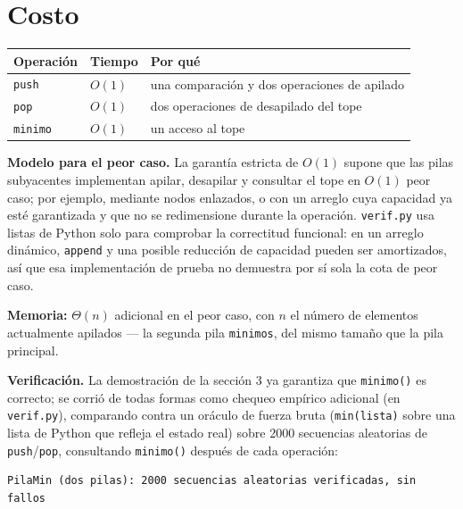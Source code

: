\documentclass[11pt]{article}
\begin{document}
\section{Costo}

\begin{center}
\begin{tabular}{@{}lll@{}}
\toprule
\textbf{Operación} & \textbf{Tiempo} & \textbf{Por qué} \\
\midrule
\texttt{push} & $O(1)$ & una comparación y dos operaciones de apilado \\
\texttt{pop} & $O(1)$ & dos operaciones de desapilado del tope \\
\texttt{minimo} & $O(1)$ & un acceso al tope \\
\bottomrule
\end{tabular}
\end{center}

\textbf{Modelo para el peor caso.} La garantía estricta de $O(1)$ supone que las pilas subyacentes implementan
apilar, desapilar y consultar el tope en $O(1)$ peor caso; por ejemplo, mediante nodos enlazados, o con un
arreglo cuya capacidad ya esté garantizada y que no se redimensione durante la operación. \texttt{verif.py}
usa listas de Python solo para comprobar la correctitud funcional: en un arreglo dinámico, \texttt{append} y una
posible reducción de capacidad pueden ser amortizados, así que esa implementación de prueba no demuestra por sí
sola la cota de peor caso.

\textbf{Memoria:} $\Theta(n)$ adicional en el peor caso, con $n$ el número de elementos actualmente
apilados --- la segunda pila \texttt{minimos}, del mismo tamaño que la pila principal.

\textbf{Verificación.} La demostración de la sección 3 ya garantiza que \texttt{minimo()} es correcto; se
corrió de todas formas como chequeo empírico adicional (en \texttt{verif.py}), comparando contra un oráculo
de fuerza bruta (\texttt{min(lista)} sobre una lista de Python que refleja el estado real) sobre 2000
secuencias aleatorias de \texttt{push}/\texttt{pop}, consultando \texttt{minimo()} después de cada operación:

\begin{lstlisting}[style=salida]
PilaMin (dos pilas): 2000 secuencias aleatorias verificadas, sin fallos
\end{lstlisting}
\end{document}
